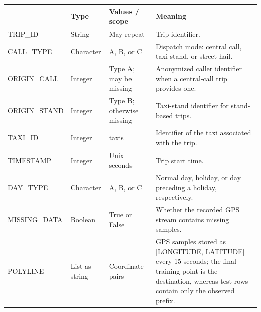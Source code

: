 \begin{tabularx}{\linewidth}{@{}>{\ttfamily\raggedright\arraybackslash}p{2.5cm}>{\raggedright\arraybackslash}p{1.9cm}>{\raggedright\arraybackslash}p{2.8cm}X@{}}
\toprule
\multicolumn{1}{@{}l}{Field} & Type & Values / scope & Meaning \\
\midrule
TRIP\_ID & String & May repeat & Trip identifier. \\
CALL\_TYPE & Character & A, B, or C & Dispatch mode: central call, taxi stand, or street hail. \\
ORIGIN\_CALL & Integer & Type A; may be missing & Anonymized caller identifier when a central-call trip provides one. \\
ORIGIN\_STAND & Integer & Type B; otherwise missing & Taxi-stand identifier for stand-based trips. \\
TAXI\_ID & Integer & 442 taxis & Identifier of the taxi associated with the trip. \\
TIMESTAMP & Integer & Unix seconds & Trip start time. \\
DAY\_TYPE & Character & A, B, or C & Normal day, holiday, or day preceding a holiday, respectively. \\
MISSING\_DATA & Boolean & True or False & Whether the recorded GPS stream contains missing samples. \\
POLYLINE & List as string & Coordinate pairs & GPS samples stored as [LONGITUDE, LATITUDE] every 15 seconds; the final training point is the destination, whereas test rows contain only the observed prefix. \\
\bottomrule
\end{tabularx}
